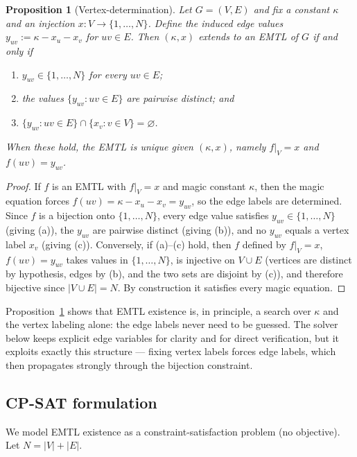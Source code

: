 \documentclass[11pt,a4paper]{article}
\theoremstyle{plain}
\newtheorem{proposition}{Proposition}
\theoremstyle{definition}
\theoremstyle{remark}
\newcommand{\km}{\kappa}
\begin{document}
\begin{proposition}[Vertex-determination]\label{prop:reduction}
Let $G=(V,E)$ and fix a constant $\km$ and an injection $x\colon V\to\{1,\dots,N\}$.
Define the induced edge values $y_{uv}:=\km-x_u-x_v$ for $uv\in E$. Then $(\km,x)$
extends to an EMTL of $G$ if and only if
\begin{enumerate}[label=(\alph*),itemsep=1pt]
  \item $y_{uv}\in\{1,\dots,N\}$ for every $uv\in E$;
  \item the values $\{y_{uv}:uv\in E\}$ are pairwise distinct; and
  \item $\{y_{uv}:uv\in E\}\cap\{x_v:v\in V\}=\varnothing$.
\end{enumerate}
When these hold, the EMTL is unique given $(\km,x)$, namely $f|_V=x$ and $f(uv)=y_{uv}$.
\end{proposition}

\begin{proof}
If $f$ is an EMTL with $f|_V=x$ and magic constant $\km$, then the magic equation
forces $f(uv)=\km-x_u-x_v=y_{uv}$, so the edge labels are determined. Since $f$ is a
bijection onto $\{1,\dots,N\}$, every edge value satisfies $y_{uv}\in\{1,\dots,N\}$
(giving (a)), the $y_{uv}$ are pairwise distinct (giving (b)), and no $y_{uv}$ equals a
vertex label $x_v$ (giving (c)).
Conversely, if (a)--(c) hold, then $f$ defined by $f|_V=x$, $f(uv)=y_{uv}$ takes
values in $\{1,\dots,N\}$, is injective on $V\cup E$ (vertices are distinct by
hypothesis, edges by (b), and the two sets are disjoint by (c)), and therefore
bijective since $|V\cup E|=N$. By construction it satisfies every magic equation.
\end{proof}

Proposition~\ref{prop:reduction} shows that EMTL existence is, in principle, a search
over $\km$ and the vertex labeling alone: the edge labels never need to be guessed.
The solver below keeps explicit edge variables for clarity and for direct
verification, but it exploits exactly this structure --- fixing vertex labels forces
edge labels, which then propagates strongly through the bijection constraint.

\subsection{CP-SAT formulation}

We model EMTL existence as a constraint-satisfaction problem (no objective). Let
$N=|V|+|E|$.
\end{document}
